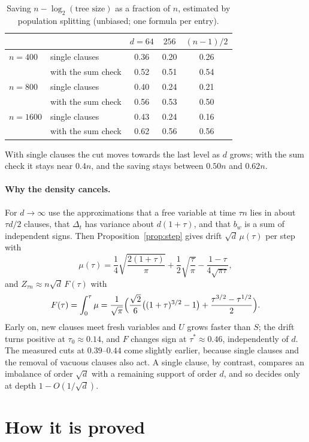 \documentclass[11pt,a4paper]{article}
\theoremstyle{definition}
\theoremstyle{remark}
\begin{document}
\begin{table}[ht]
\centering
\begin{tabular}{llccc}
\toprule
 & & $d=64$ & $256$ & $(n-1)/2$\\
\midrule
$n=400$ & single clauses & 0.36 & 0.20 & 0.26\\
 & with the sum check & 0.52 & 0.51 & 0.54\\
$n=800$ & single clauses & 0.40 & 0.24 & 0.21\\
 & with the sum check & 0.56 & 0.53 & 0.50\\
$n=1600$ & single clauses & 0.43 & 0.24 & 0.16\\
 & with the sum check & 0.62 & 0.56 & 0.56\\
\bottomrule
\end{tabular}
\caption{Saving $n-\log_2(\text{tree size})$ as a fraction of $n$, estimated by
population splitting (unbiased; one formula per entry).}\label{tab:trees}
\end{table}

With single clauses the cut moves towards the last level as $d$ grows; with the
sum check it stays near $0.4n$, and the saving stays between $0.50n$ and $0.62n$.

\paragraph{Why the density cancels.} For $d\to\infty$ use the approximations
that a free variable at time $\tau n$ lies in about $\tau d/2$ clauses, that
$\Delta_t$ has variance about $d(1+\tau)$, and that $b_w$ is a sum of
independent signs. Then Proposition~\ref{prop:step} gives drift $\sqrt d\,\mu(\tau)$
per step with
\[
 \mu(\tau)=\frac14\sqrt{\frac{2(1+\tau)}\pi}+\frac12\sqrt{\frac\tau\pi}
 -\frac{1-\tau}{4\sqrt{\pi\tau}},
\]
and $Z_{\tau n}\approx n\sqrt d\,F(\tau)$ with
\[
 F(\tau)=\int_0^\tau\mu
 =\frac1{\sqrt\pi}\Bigl(\frac{\sqrt2}6\bigl((1+\tau)^{3/2}-1\bigr)
 +\frac{\tau^{3/2}-\tau^{1/2}}2\Bigr).
\]
Early on, new clauses meet fresh variables and $U$ grows faster than $S$; the
drift turns positive at $\tau_0\approx0.14$, and $F$ changes sign at
$\tau^*\approx0.46$, independently of $d$. The measured cuts at $0.39$--$0.44$
come slightly earlier, because single clauses and the removal of vacuous
clauses also act. A single clause, by contrast, compares an imbalance of order
$\sqrt d$ with a remaining support of order $d$, and so decides only at depth
$1-O(1/\sqrt d)$.

\section{How it is proved}\label{sec:proof}
\end{document}
